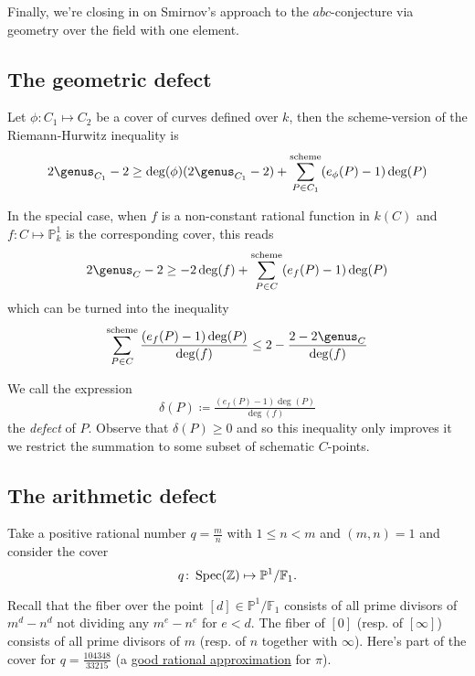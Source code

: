 Finally, we're closing in on Smirnov's approach to the $abc$-conjecture via geometry over the field with one element.

\subsection{The geometric defect}

Let $\phi\colon C_1 \mapsto C_2$ be a cover of curves defined over $k$, then the scheme-version of the Riemann-Hurwitz inequality is
\begin{equation}
  2 \genus_{C_1} - 2 \geq \deg(\phi) (2 \genus_{C_1} -2) + \sum^{\text{scheme}}_{P \in C_1} (e_{\phi}(P)-1) \deg(P)
\end{equation}

In the special case, when $f$ is a non-constant rational function in $k(C)$ and $f\colon C \mapsto \mathbb{P}^1_k$ is the corresponding cover, this reads
\begin{equation}
  2\genus_C-2 \geq -2 \deg(f) + \sum^{\text{scheme}}_{P \in C} (e_f(P)-1) \deg(P)
\end{equation}
which can be turned into the inequality
\begin{equation}
  \sum^{\text{scheme}}_{P \in C} \frac{(e_f(P)-1) \deg(P)}{\deg(f)} \leq 2 - \frac{2-2\genus_C}{\deg(f)}
\end{equation}

We call the expression
\begin{equation}
  \delta(P) \coloneqq \tfrac{(e_f(P)-1) \deg(P)}{\deg(f)}  
\end{equation}
the \emph{defect} of $P$. Observe that $\delta(P) \geq 0$ and so this inequality only improves it we restrict the summation to some subset of schematic $C$-points.

\subsection{The arithmetic defect}

Take a positive rational number $q = \frac{m}{n}$ with $1 \leq n < m$ and $(m,n)=1$ and consider the cover
\begin{equation}
  q\colon\operatorname{Spec}(\mathbb{Z}) \mapsto \mathbb{P}^1 / \mathbb{F}_1.
\end{equation}

Recall that the fiber over the point $[d] \in \mathbb{P}^1 / \mathbb{F}_1$ consists of all prime divisors of $m^d-n^d$ not dividing any $m^e-n^e$ for $e < d$. The fiber of $[0]$ (resp. of $[\infty]$) consists of all prime divisors of $m$ (resp. of $n$ together with $\infty$). Here's part of the cover for $q=\frac{104348}{33215}$ (a \href{http://mathworld.wolfram.com/PiApproximations.html}{good rational approximation} for $\pi$).

